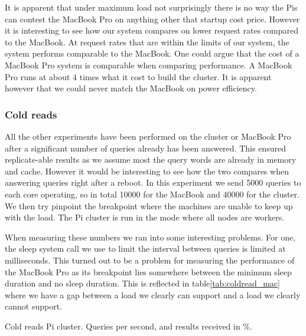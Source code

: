 It is apparent that under maximum load not surprisingly there is no way the Pis can contest the MacBook Pro on anything other that startup cost price.
However it is interesting to see how our system compares on lower request rates compared to the MacBook.
At request rates that are within the limits of our system, the system performs comparable to the MacBook. One could argue that the cost of a MacBook Pro system is comparable when comparing performance. A MacBook Pro runs at about 4 times what it cost to build the cluster. It is apparent however that we could never match the MacBook on power efficiency.

\subsubsection{Cold reads}
\label{sec:coldread}
All the other experiments have been performed on the cluster or MacBook Pro after a significant number of queries already has been answered. This ensured replicate-able results as we assume most the query words are already in memory and cache. However it would be interesting to see how the two compares when answering queries right after a reboot. In this experiment we send 5000 queries to each core operating, so in total 10000 for the MacBook and 40000 for the cluster. We then try pinpoint the breakpoint where the machines are unable to keep up with the load. The Pi cluster is run in the mode where all nodes are workers.

When measuring these numbers we ran into some interesting problems. For one, the sleep system call we use to limit the interval between queries is limited at milliseconds. This turned out to be a problem for measuring the performance of the MacBook Pro as its breakpoint lies somewhere between the minimum sleep duration and no sleep duration. This is reflected in table\ref{tab:coldread_mac} where we have a gap between a load we clearly can support and a load we clearly cannot support.

\begin{table}[h]
	\coldreadpi
	\centering
	\pgfplotstabletypeset[
     	columns={orps, oanswers},
     	every head row/.style={after row=\hline},
		every last row/.style={after row=\hline},
		columns/orps/.style={column name=Queries per second},
		columns/oanswers/.style={column name=received(\%)},
     	]
    {\coldreadpi}
    \caption{Cold reads Pi cluster. Queries per second, and results received in \%.}
\label{tab:coldread_pi}
\end{table}

